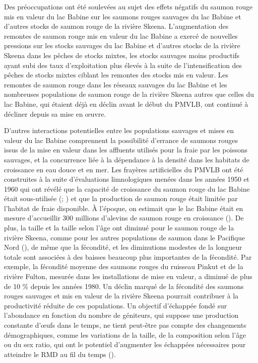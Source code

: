 \documentclass[french,11pt]{book}
\begin{document}
Des préoccupations ont été soulevées au sujet des effets négatifs du saumon rouge mis en valeur du lac Babine sur les saumons rouges sauvages du lac Babine et d'autres stocks de saumon rouge de la rivière Skeena. L'augmentation des remontes de saumon rouge mis en valeur du lac Babine a exercé de nouvelles pressions sur les stocks sauvages du lac Babine et d'autres stocks de la rivière Skeena dans les pêches de stocks mixtes, les stocks sauvages moins productifs ayant subi des taux d'exploitation plus élevés à la suite de l'intensification des pêches de stocks mixtes ciblant les remontes des stocks mis en valeur. Les remontes de saumon rouge dans les réseaux sauvages du lac Babine et les nombreuses populations de saumon rouge de la rivière Skeena autres que celles du lac Babine, qui étaient déjà en déclin avant le début du PMVLB, ont continué à décliner depuis sa mise en œuvre.

D'autres interactions potentielles entre les populations sauvages et mises en valeur du lac Babine comprennent la possibilité d'errance de saumons rouges issus de la mise en valeur dans les affluents utilisés pour la fraie par les poissons sauvages, et la concurrence liée à la dépendance à la densité dans les habitats de croissance en eau douce et en mer. Les frayères artificielles du PMVLB ont été construites à la suite d'évaluations limnologiques menées dans les années 1950 et 1960 qui ont révélé que la capacité de croissance du saumon rouge du lac Babine était sous-utilisée (; ) et que la production de saumon rouge était limitée par l'habitat de fraie disponible. À l'époque, on estimait que le lac Babine était en mesure d'accueillir 300 millions d'alevins de saumon rouge en croissance (). De plus, la taille et la taille selon l'âge ont diminué pour le saumon rouge de la rivière Skeena, comme pour les autres populations de saumon dans le Pacifique Nord (), de même que la fécondité, et les diminutions modestes de la longueur totale sont associées à des baisses beaucoup plus importantes de la fécondité. Par exemple, la fécondité moyenne des saumons rouges du ruisseau Pinkut et de la rivière Fulton, mesurée dans les installations de mise en valeur, a diminué de plus de 10 \% depuis les années 1980. Un déclin marqué de la fécondité des saumons rouges sauvages et mis en valeur de la rivière Skeena pourrait contribuer à la productivité réduite de ces populations. Un objectif d'échappée fondé sur l'abondance en fonction du nombre de géniteurs, qui suppose une production constante d'œufs dans le temps, ne tient peut-être pas compte des changements démographiques, comme les variations de la taille, de la composition selon l'âge ou du sex ratio, qui ont le potentiel d'augmenter les échappées nécessaires pour atteindre le RMD au fil du temps ().
\end{document}
